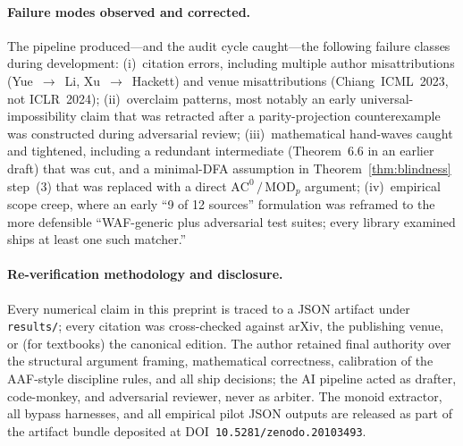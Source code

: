 \documentclass[letterpaper,twocolumn,10pt]{article}
\theoremstyle{definition}
\theoremstyle{remark}
\begin{document}
\paragraph{Failure modes observed and corrected.}
The pipeline produced---and the audit cycle caught---the following failure
classes during development:
(i)~citation errors, including multiple author misattributions (Yue~$\to$~Li,
Xu~$\to$~Hackett) and venue misattributions (Chiang~ICML~2023, not
ICLR~2024);
(ii)~overclaim patterns, most notably an early universal-impossibility claim
that was retracted after a parity-projection counterexample was constructed
during adversarial review;
(iii)~mathematical hand-waves caught and tightened, including a redundant
intermediate (Theorem~6.6 in an earlier draft) that was cut, and a
minimal-DFA assumption in Theorem~\ref{thm:blindness} step~(3)
that was replaced with a direct $\mathrm{AC}^0\,/\,\mathrm{MOD}_p$ argument;
(iv)~empirical scope creep, where an early ``9 of 12 sources'' formulation
was reframed to the more defensible ``WAF-generic plus adversarial test
suites; every library examined ships at least one such matcher.''

\paragraph{Re-verification methodology and disclosure.}
Every numerical claim in this preprint is traced to a JSON artifact under
\texttt{results/}; every citation was cross-checked against arXiv, the
publishing venue, or (for textbooks) the canonical edition.
The author retained final authority over the structural argument framing,
mathematical correctness, calibration of the AAF-style discipline rules, and
all ship decisions; the AI pipeline acted as drafter, code-monkey, and
adversarial reviewer, never as arbiter.
The monoid extractor, all bypass harnesses, and all empirical pilot JSON
outputs are released as part of the artifact bundle deposited at
DOI~\texttt{10.5281/zenodo.20103493}.
\end{document}

